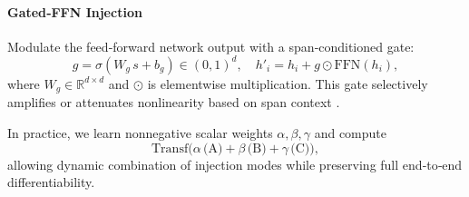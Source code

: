 \paragraph{Gated‐FFN Injection}
Modulate the feed‐forward network output with a span‐conditioned gate:
\[
g = \sigma(W_g\,s + b_g)\in(0,1)^d,\quad
h'_i = h_i + g\odot\mathrm{FFN}(h_i),
\]
where \(W_g\in\mathbb{R}^{d\times d}\) and \(\odot\) is elementwise multiplication.  This gate selectively amplifies or attenuates nonlinearity based on span context \cite{shazeer2017outrageously}.

\medskip
In practice, we learn nonnegative scalar weights \(\alpha,\beta,\gamma\) and compute
\[
\mathrm{Transf}\bigl(
\alpha\,\text{(A)} + \beta\,\text{(B)} + \gamma\,\text{(C)}
\bigr),
\]
allowing dynamic combination of injection modes while preserving full end‐to‐end differentiability.